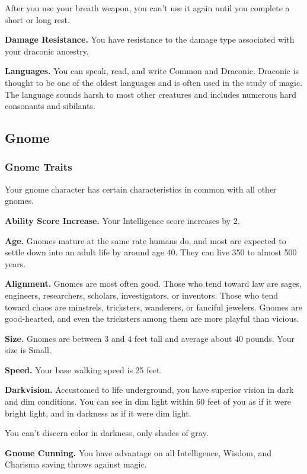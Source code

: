 After you use your breath weapon, you can't use it again until you
complete a short or long rest.

\textbf{Damage Resistance.} You have resistance to the damage type
associated with your draconic ancestry.

\textbf{Languages.} You can speak, read, and write Common and Draconic.
Draconic is thought to be one of the oldest languages and is often used
in the study of magic. The language sounds harsh to most other creatures
and includes numerous hard consonants and sibilants.

\hypertarget{gnome}{%
\subsection{Gnome}\label{gnome}}

\hypertarget{gnome-traits}{%
\subsubsection{Gnome Traits}\label{gnome-traits}}

Your gnome character has certain characteristics in common with all
other gnomes.

\textbf{Ability Score Increase.} Your Intelligence score increases by 2.

\textbf{Age.} Gnomes mature at the same rate humans do, and most are
expected to settle down into an adult life by around age 40. They can
live 350 to almost 500 years.

\textbf{Alignment.} Gnomes are most often good. Those who tend toward
law are sages, engineers, researchers, scholars, investigators, or
inventors. Those who tend toward chaos are minstrels, tricksters,
wanderers, or fanciful jewelers. Gnomes are good-hearted, and even the
tricksters among them are more playful than vicious.

\textbf{Size.} Gnomes are between 3 and 4 feet tall and average about 40
pounds. Your size is Small.

\textbf{Speed.} Your base walking speed is 25 feet.

\textbf{Darkvision.} Accustomed to life underground, you have superior
vision in dark and dim conditions. You can see in dim light within 60
feet of you as if it were bright light, and in darkness as if it were
dim light.

You can't discern color in darkness, only shades of gray.

\textbf{Gnome Cunning.} You have advantage on all Intelligence, Wisdom,
and Charisma saving throws against magic.

